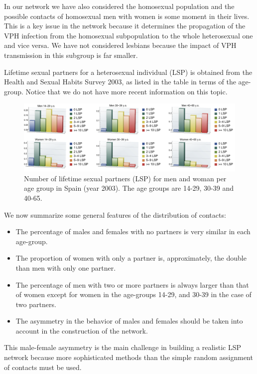 In our network we have also considered the homosexual population and the possible contacts of homosexual men with women is some moment in their lives. This is a key issue in the network because it determines the propagation of the VPH infection from the homosexual subpopulation to the whole heterosexual one and vice versa. We have not considered lesbians because the impact of VPH transmission in this subgroup is far smaller.

Lifetime sexual partners for a heterosexual individual (LSP) is obtained from the Health and Sexual Habits Survey 2003, as listed in the table in terms of the age-group. Notice that we do not have more recent information on this topic.


\begin{figure}[h]
	\centering
	\includegraphics[scale=0.7]{lsp.pdf}
	\caption{Number of lifetime sexual partners (LSP) for men and woman per age group in Spain (year 2003). The age groups are 14-29, 30-39 and 40-65.}
	\label{lsp}
\end{figure}


We now summarize some general features of the distribution of contacts:


\begin{itemize}
	\item The percentage of males and females with no partners is very similar in each age-group.
	\item The proportion of women with only a partner is, approximately,
the double than men with only one partner. 
	\item The percentage of men with two or more partners is always larger than that of women except for women in the age-groups 14-29, and 30-39 in the case of two partners.
	\item The asymmetry in the behavior of males and females should be taken into account in the construction of the network.
\end{itemize}

This male-female asymmetry is the main challenge in building a realistic LSP network because more sophisticated methods than the simple random assignment of contacts must be used.

